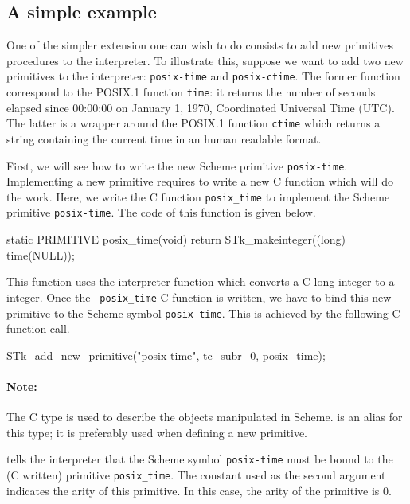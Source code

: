 \documentclass[10pt]{article}
\begin{document}
\subsection{A simple example}

\label{simple-example}
One of the simpler extension one can wish to do consists to add new
primitives procedures to the interpreter. To illustrate this, suppose
we want to add two new primitives to the interpreter: {\tt posix-time}
and {\tt posix-ctime}.  The former function correspond to the
POSIX.1\cite{POSIX.1-90} function {\tt time}: it returns the number
of seconds elapsed since 00:00:00 on January 1, 1970, Coordinated
Universal Time (UTC).  The latter is a wrapper around the POSIX.1
function {\tt ctime} which returns a string containing the current
time in an human readable format.

First, we will see how to write the new Scheme primitive {\tt posix-time}.
Implementing a new primitive requires to write a new C function which will do
the work. Here, we write the C function {\tt posix\_time} to implement the
Scheme primitive {\tt posix-time}. The code of this function is given below.
\begin{Code}
\begin{listing}[200]{2}
static PRIMITIVE posix_time(void)
{
  return STk_makeinteger((long) time(NULL));
}
\end{listing}
\end{Code}
This function uses the interpreter  function
which converts a C long integer to a {\stk} integer. Once the {\tt
posix\_time} C function is written, we have to bind this new primitive to
the Scheme symbol {\tt posix-time}. This is achieved by the following C
function call.
\begin{Code}
\begin{listing}[200]{2}
STk_add_new_primitive("posix-time", tc_subr_0, posix_time);
\end{listing}
\end{Code}

\paragraph*{Note:} The C type  is used to describe the objects
manipulated in Scheme.  is an alias for this type; it
is preferably used when defining a new primitive.

 tells the interpreter that the Scheme 
symbol {\tt posix-time} must be bound to the (C written) primitive
{\tt posix\_time}.  The constant  used as the second
argument indicates the arity of this primitive. In this case, the
arity of the primitive is 0.
\end{document}
